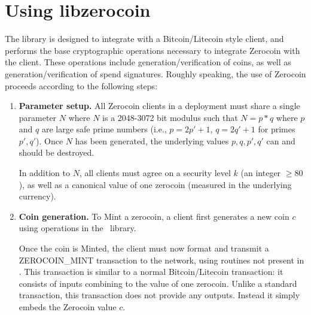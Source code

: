 \section{Using libzerocoin}

The \libzerocoin library is designed to integrate with a Bitcoin/Litecoin style client, and performs the base cryptographic operations necessary to integrate Zerocoin with the client. These operations include generation/verification of coins, as well as generation/verification of spend signatures. Roughly speaking, the use of Zerocoin proceeds according to the following steps:

\begin{enumerate}
\item {\bf Parameter setup.} All Zerocoin clients in a deployment must share a single parameter $N$ where $N$ is a 2048-3072 bit modulus such that $N = p*q$ where $p$ and $q$ are large safe prime numbers (i.e., $p = 2p'+1$, $q = 2q'+1$ for primes $p', q'$). Once $N$ has been generated, the underlying values $p, q, p', q'$ can and should be destroyed.
 
In addition to $N$, all clients must agree on a security level $k$ (an integer $\ge 80$), as well as a canonical value of one zerocoin (measured in the underlying currency).

\item {\bf Coin generation.} To Mint a zerocoin, a client first generates a new coin $c$ using operations in the \libzerocoin~library. 

Once the coin is Minted, the client must now format and transmit a \textsf{ZEROCOIN\_MINT} transaction to the network, using routines not present in \libzerocoin. This transaction is similar to a normal Bitcoin/Litecoin transaction: it consists of inputs combining to the value of one zerocoin. Unlike a standard transaction, this transaction does not provide any outputs. Instead it simply embeds the Zerocoin value $c$. 
 
\end{enumerate} 
